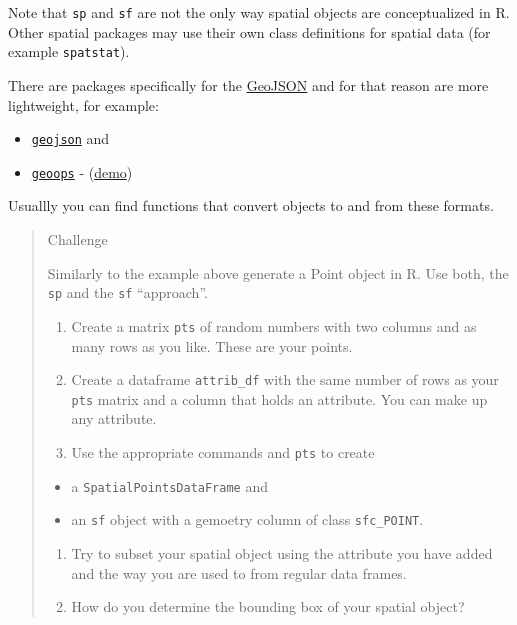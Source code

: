\documentclass[]{book}
\providecommand{\tightlist}{%
  \setlength{\itemsep}{0pt}\setlength{\parskip}{0pt}}
\begin{document}
Note that \texttt{sp} and \texttt{sf} are not the only way spatial
objects are conceptualized in R. Other spatial packages may use their
own class definitions for spatial data (for example \texttt{spatstat}).

There are packages specifically for the
\href{https://tools.ietf.org/html/rfc7946}{GeoJSON} and for that reason
are more lightweight, for example:

\begin{itemize}
\tightlist
\item
  \href{https://cran.r-project.org/package=geojson}{\texttt{geojson}}
  and\\
\item
  \href{https://CRAN.R-project.org/package=geoops}{\texttt{geoops}} -
  (\href{https://cran.r-project.org/web/packages/geoops/vignettes/geoops_vignette.html}{demo})
\end{itemize}

Usuallly you can find functions that convert objects to and from these
formats.

\begin{quote}
Challenge

Similarly to the example above generate a Point object in R. Use both,
the \texttt{sp} and the \texttt{sf} ``approach''.

\begin{enumerate}
\def\labelenumi{\arabic{enumi}.}
\tightlist
\item
  Create a matrix \texttt{pts} of random numbers with two columns and as
  many rows as you like. These are your points.
\item
  Create a dataframe \texttt{attrib\_df} with the same number of rows as
  your \texttt{pts} matrix and a column that holds an attribute. You can
  make up any attribute.
\item
  Use the appropriate commands and \texttt{pts} to create
\end{enumerate}

\begin{itemize}
\tightlist
\item
  a \texttt{SpatialPointsDataFrame} and
\item
  an \texttt{sf} object with a gemoetry column of class
  \texttt{sfc\_POINT}.
\end{itemize}

\begin{enumerate}
\def\labelenumi{\arabic{enumi}.}
\setcounter{enumi}{3}
\tightlist
\item
  Try to subset your spatial object using the attribute you have added
  and the way you are used to from regular data frames.
\item
  How do you determine the bounding box of your spatial object?
\end{enumerate}
\end{quote}
\end{document}
